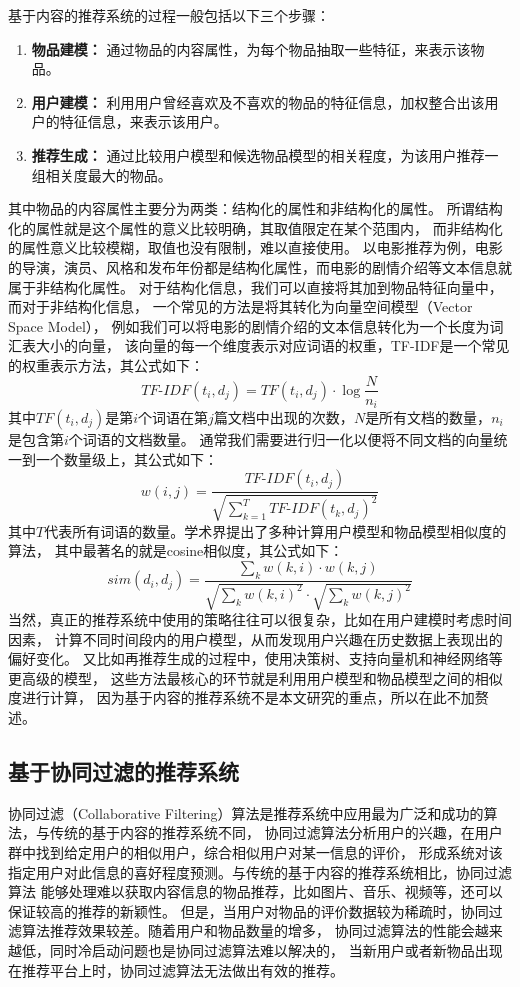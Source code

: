 基于内容的推荐系统的过程一般包括以下三个步骤：
\begin{enumerate}
\item \textbf{物品建模：} 通过物品的内容属性，为每个物品抽取一些特征，来表示该物品。
\item \textbf{用户建模：} 利用用户曾经喜欢及不喜欢的物品的特征信息，加权整合出该用户的特征信息，来表示该用户。
\item \textbf{推荐生成：} 通过比较用户模型和候选物品模型的相关程度，为该用户推荐一组相关度最大的物品。
\end{enumerate}
其中物品的内容属性主要分为两类：结构化的属性和非结构化的属性。
所谓结构化的属性就是这个属性的意义比较明确，其取值限定在某个范围内，
而非结构化的属性意义比较模糊，取值也没有限制，难以直接使用。
以电影推荐为例，电影的导演，演员、风格和发布年份都是结构化属性，而电影的剧情介绍等文本信息就属于非结构化属性。
对于结构化信息，我们可以直接将其加到物品特征向量中，而对于非结构化信息，
一个常见的方法是将其转化为向量空间模型（Vector Space Model），
例如我们可以将电影的剧情介绍的文本信息转化为一个长度为词汇表大小的向量，
该向量的每一个维度表示对应词语的权重，TF-IDF是一个常见的权重表示方法，其公式如下：
\begin{equation}
TF\textrm{-}IDF(t_i, d_j) = TF(t_i, d_j) \cdot \log{ \frac{N}{n_i} }
\end{equation}
其中$TF(t_i, d_j)$是第$i$个词语在第$j$篇文档中出现的次数，$N$是所有文档的数量，$n_i$是包含第$i$个词语的文档数量。
通常我们需要进行归一化以便将不同文档的向量统一到一个数量级上，其公式如下：
\begin{equation}
w(i, j) = \frac{ TF\textrm{-}IDF(t_i, d_j) }{ \sqrt{\sum_{k=1}^{T}{TF\textrm{-}IDF(t_k, d_j)^2}} } 
\end{equation}
其中$T$代表所有词语的数量。学术界提出了多种计算用户模型和物品模型相似度的算法，
其中最著名的就是cosine相似度，其公式如下：
\begin{equation}
sim(d_i, d_j) = \frac{ \sum_k{ w(k, i) \cdot w(k, j) } }
{ \sqrt{\sum_{k}{w(k, i)^2}} \cdot \sqrt{\sum_{k}{w(k, j)^2}} } 
\end{equation}
当然，真正的推荐系统中使用的策略往往可以很复杂，比如在用户建模时考虑时间因素，
计算不同时间段内的用户模型，从而发现用户兴趣在历史数据上表现出的偏好变化。
又比如再推荐生成的过程中，使用决策树、支持向量机和神经网络等更高级的模型，
这些方法最核心的环节就是利用用户模型和物品模型之间的相似度进行计算，
因为基于内容的推荐系统不是本文研究的重点，所以在此不加赘述。

\subsection{基于协同过滤的推荐系统}
协同过滤（Collaborative Filtering）算法是推荐系统中应用最为广泛和成功的算法，与传统的基于内容的推荐系统不同，
协同过滤算法分析用户的兴趣，在用户群中找到给定用户的相似用户，综合相似用户对某一信息的评价，
形成系统对该指定用户对此信息的喜好程度预测。与传统的基于内容的推荐系统相比，协同过滤算法
能够处理难以获取内容信息的物品推荐，比如图片、音乐、视频等，还可以保证较高的推荐的新颖性。
但是，当用户对物品的评价数据较为稀疏时，协同过滤算法推荐效果较差。随着用户和物品数量的增多，
协同过滤算法的性能会越来越低，同时冷启动问题也是协同过滤算法难以解决的，
当新用户或者新物品出现在推荐平台上时，协同过滤算法无法做出有效的推荐。


